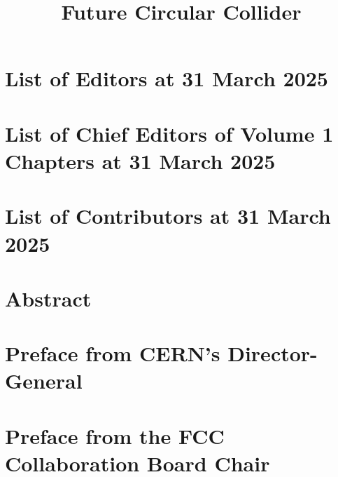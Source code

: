 \documentclass[11pt,twoside,a4paper]{cernyrep}
\begin{document}

\title{Future Circular Collider}

\setcounter{page}{1}

\newcommand{\main}{.}
\def\biblio{}




\begingroup
\raggedright %

\section*{List of Editors at 31 March 2025}

\section*{List of Chief Editors of Volume 1 Chapters at 31 March 2025}

\section*{List of Contributors at 31 March 2025}

\begin{itemize}

\end{itemize}

\endgroup

\clearpage

\section*{Abstract}


\clearpage

\section*{Preface from CERN's Director-General}



\clearpage

\section*{Preface from the FCC Collaboration Board Chair}



\clearpage



\tableofcontents

\cleardoublepage
{}
\setcounter{page}{1}



\clearpage



%

\end{document}
